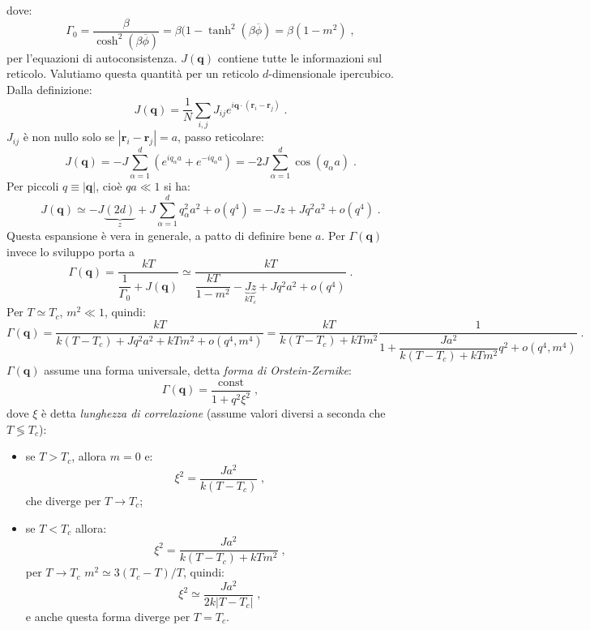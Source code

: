 \documentclass[10pt,a4paper]{report}
\theoremstyle{definition}
\numberwithin{equation}{section}
\begin{document}
dove:
\begin{equation}
\Gamma_0=\frac{\beta}{\cosh^2(\beta\overline{\phi})}=\beta(1-\tanh^2(\beta\overline{\phi})=\beta(1-m^2)\;,
\end{equation}
per l'equazioni di autoconsistenza. $J(\mathbf{q})$ contiene tutte le informazioni sul reticolo. Valutiamo questa quantità per un reticolo $d$-dimensionale ipercubico. Dalla definizione:
$$
J(\mathbf{q})=\frac{1}{N}\sum_{i,j}J_{ij}e^{i\mathbf{q}\cdot(\mathbf{r}_i-\mathbf{r}_j)}\;.
$$
$J_{ij}$ è non nullo solo se $|\mathbf{r}_i-\mathbf{r}_j|=a$, passo reticolare:
\begin{equation}
J(\mathbf{q})=-J\sum_{\alpha=1}^d(e^{iq_{\alpha}a}+e^{-iq_{\alpha}a})=-2J\sum_{\alpha=1}^d\cos(q_{\alpha}a)\;.
\end{equation}
Per piccoli $q\equiv |\mathbf{q}|$, cioè $qa\ll 1$ si ha:
\begin{equation}
J(\mathbf{q})\simeq -J\underbrace{(2d)}_{z}+J\sum_{\alpha=1}^d q_{\alpha}^2a^2+o(q^4)=-Jz+Jq^2a^2+o(q^4)\;.
\end{equation}
Questa espansione è vera in generale, a patto di definire bene $a$. Per $\Gamma(\mathbf{q})$ invece lo sviluppo porta a 
\begin{equation}
\Gamma(\mathbf{q})=\frac{kT}{\dfrac{1}{\Gamma_0}+J(\mathbf{q})}\simeq \frac{kT}{\dfrac{kT}{1-m^2}-\underbrace{Jz}_{kT_c}+Jq^2a^2+o(q^4)}\;.
\end{equation}
Per $T\simeq T_c$, $m^2\ll 1$, quindi:
$$
\Gamma(\mathbf{q})=\frac{kT}{k(T-T_c)+Jq^2a^2+kTm^2+o(q^4,m^4)}=\frac{kT}{k(T-T_c)+kTm^2}\frac{1}{1+\dfrac{Ja^2}{k(T-T_c)+kTm^2}q^2+o(q^4,m^4)}\;.
$$
$\Gamma(\mathbf{q})$ assume una forma universale, detta \emph{forma di Orstein-Zernike}:
\begin{equation}
\Gamma(\mathbf{q})=\frac{\mathrm{const}}{1+q^2\xi^2}\;,
\end{equation}
dove $\xi$ è detta \emph{lunghezza di correlazione} (assume valori diversi a seconda che $T\lessgtr T_c$):
\begin{itemize}
\item se $T>T_c$, allora $m=0$ e:
\begin{equation}
\xi^2=\frac{Ja^2}{k(T-T_c)}\;,
\end{equation}
che diverge per $T\to T_c$;
\item se $T<T_c$ allora:
\begin{equation}
\xi^2=\frac{Ja^2}{k(T-T_c)+kTm^2}\;,
\end{equation}
per $T\to T_c$ $m^2\simeq 3(T_c-T)/T$, quindi:
\begin{equation}
\xi^2\simeq \frac{Ja^2}{2k|T-T_c|}\;,
\end{equation}
e anche questa forma diverge per $T=T_c$.
\end{itemize}
\end{document}
